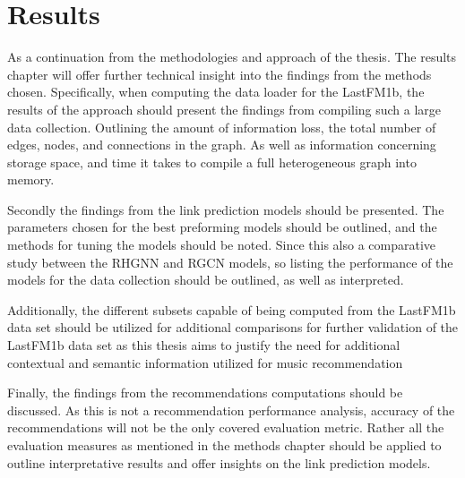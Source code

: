 
\chapter{Results}   
As a continuation from the methodologies and approach of the thesis. The results chapter will offer further technical insight into the findings from the methods chosen. Specifically, when computing the data loader for the LastFM1b, the results of the approach should present the findings from compiling such a large  data collection. Outlining the amount of information loss, the total number of edges, nodes, and connections in the graph. As well as information concerning storage space, and time it takes to compile a full heterogeneous graph into memory.

Secondly the findings from the link prediction models should be presented. The parameters chosen for the best preforming models should be outlined, and the methods for tuning the models should be noted. Since this also a comparative study between the RHGNN and RGCN models, so listing the performance of the models for the data collection should be outlined, as well as interpreted.

Additionally, the different subsets capable of being computed from the LastFM1b data set should be utilized for additional comparisons for further validation of the LastFM1b data set as this thesis aims to justify the need for additional contextual and semantic information utilized for music recommendation 

Finally, the findings from the recommendations computations should be discussed. As this is not a recommendation performance analysis, accuracy of the recommendations will not be the only covered evaluation metric. Rather all the evaluation measures as mentioned in the methods chapter should be applied to outline interpretative results and offer insights on the link prediction models.





\newpage


